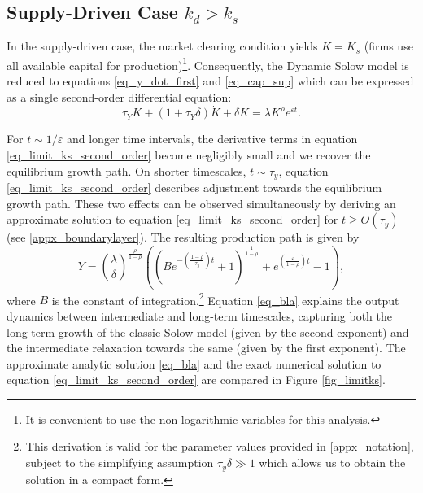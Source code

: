 \documentclass[authoryear, review]{elsarticle}
\begin{document}
\subsection{Supply-Driven Case $k_d>k_s$}\label{sec_ks_limit}
In the supply-driven case, the market clearing condition yields $K=K_s$ (firms use all available capital for production)\footnote{It is convenient to use the non-logarithmic variables for this analysis.}. Consequently, the Dynamic Solow model is reduced to equations \eqref{eq_y_dot_first} and \eqref{eq_cap_sup}
which can be expressed as a single second-order differential equation:
\begin{equation}\label{eq_limit_ks_second_order}
    \tau_Y\ddot{K} + (1+\tau_Y\delta)\dot{K} + \delta K = \lambda K^\rho e^{\varepsilon t}.
\end{equation}

For $t\sim1/\varepsilon$ and longer time intervals, the derivative terms in equation \eqref{eq_limit_ks_second_order} become negligibly small and we recover the equilibrium growth path. On shorter timescales, $t\sim\tau_y$, equation \eqref{eq_limit_ks_second_order} describes adjustment towards the equilibrium growth path. These two effects can be observed simultaneously by deriving an approximate solution to equation \eqref{eq_limit_ks_second_order} for $t\geq O(\tau_y)$ (see \ref{appx_boundarylayer}). The resulting production path is given by
\begin{equation}\label{eq_bla}
    Y = \left(\frac{\lambda}{\delta}\right)^{\frac{\rho}{1-\rho}} \left(\left(Be^{-\left(\frac{1-\rho}{\tau_y}\right)t}+1\right)^{\frac{1}{1-\rho}} +e^{\left(\frac{\varepsilon}{1-\rho}\right)t}-1\right),
\end{equation}
where $B$ is the constant of integration.\footnote{
	This derivation is valid for the parameter values provided in \ref{appx_notation}, subject to the simplifying assumption $\tau_y\delta\gg1$ which allows us to obtain the solution in a compact form.
} Equation \eqref{eq_bla} explains the output dynamics between intermediate and long-term timescales, capturing both the long-term growth of the classic Solow model (given by the second exponent) and the intermediate relaxation towards the same (given by the first exponent). The approximate analytic solution \eqref{eq_bla} and the exact numerical solution to equation \eqref{eq_limit_ks_second_order} are compared in Figure \ref{fig_limitks}.
\end{document}
